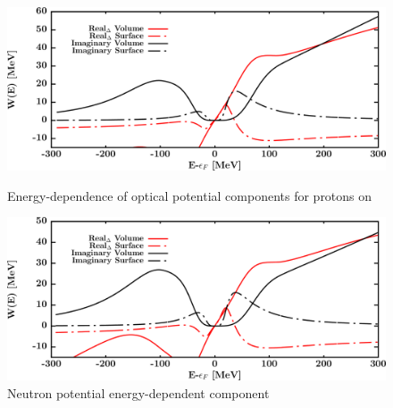 \begin{figure}[H]
    \centering
    \begin{minipage}{0.45\textwidth}
        \centering
        \includegraphics[width=1.0\textwidth]{figures/ni64_protonPotentials.png}
        \caption{Energy-dependence of optical potential components for protons
        on \niFour}
        \label{DOMFitData_ni64_proton_potentialComponent_energy}
    \end{minipage}\hfill
    \begin{minipage}{0.45\textwidth}
        \centering
        \includegraphics[width=1.0\textwidth]{figures/ni64_neutronPotentials.png}
        \caption{Neutron potential energy-dependent component}
        \label{DOMFitData_ni64_neutron_potentialComponent_energy}
    \end{minipage}
\end{figure}

